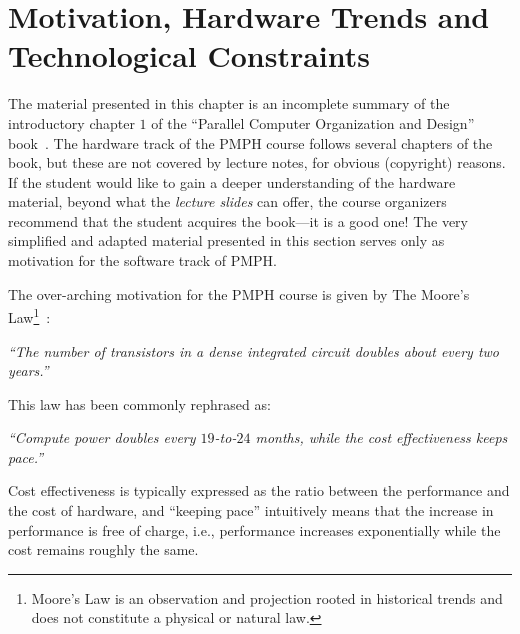 \documentclass[acmsmall,review]{acmart}\settopmatter{printfolios=true,printccs=false,printacmref=false}
\begin{document}




\maketitle

\newpage
\tableofcontents
\newpage

\section{Motivation, Hardware Trends and Technological Constraints}

The material presented in this chapter is an incomplete summary 
of the introductory chapter $1$ of the ``Parallel Computer 
Organization and Design'' book~\cite{Dubois:2012:PCO:2462779}.
The hardware track of the PMPH course follows several chapters 
of the book, but these are not covered by lecture notes, for
obvious (copyright) reasons. If the student would like to gain 
a deeper understanding of the hardware material, beyond what 
the \emph{lecture slides} can offer, the course organizers 
recommend that the student acquires the book---it is a good one!  
The very simplified and adapted material presented in this 
section serves only as motivation for the software track of PMPH.\bigskip

The over-arching motivation for the PMPH course is given by The 
Moore's Law\footnote{
Moore's Law is an observation and projection rooted in 
historical trends and does not constitute a physical or natural 
law.
}~\cite{Moore-Law-65}:
\begin{center}
\emph{``The number of transistors in a dense integrated circuit 
doubles about every two years.''}
\end{center}
%
This law has been commonly rephrased as:
\begin{center}
{\center \emph{ ``Compute power doubles every $19$-to-$24$ months, 
while the cost effectiveness keeps pace.''}}\\
\end{center}
%
Cost effectiveness is typically expressed as the ratio 
between the performance and the cost of hardware, and ``keeping 
pace'' intuitively means that the increase in performance is free
of charge, i.e., performance increases exponentially while the cost
remains roughly the same. 
\end{document}
